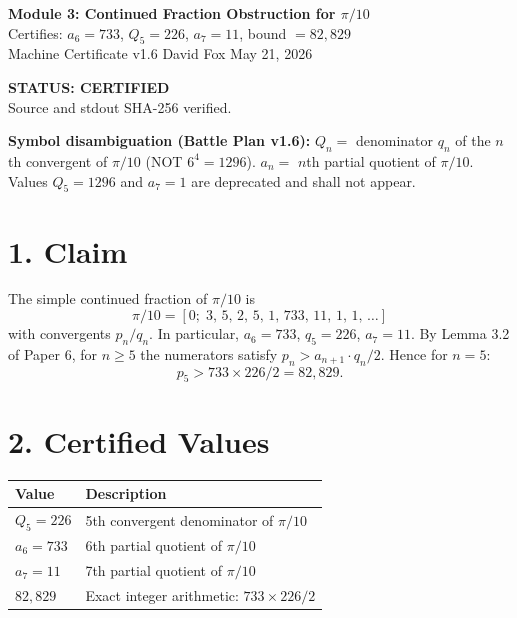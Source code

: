 \documentclass[11pt,letterpaper]{article}
\begin{document}
\begin{center}
{\Large\bfseries Module 3: Continued Fraction Obstruction for $\pi/10$}\\[4pt]
{\large Certifies: $a_6 = 733$, $Q_5 = 226$, $a_7 = 11$, bound $= 82{,}829$}\\[2pt]
{\normalsize Machine Certificate v1.6 \quad David Fox \quad May 21, 2026}
\end{center}
\vspace{0.5em}
\begin{center}
\colorbox{certgreen!15}{\parbox{0.85\textwidth}{\centering
\textcolor{certgreen}{\bfseries STATUS: CERTIFIED \checkmark}\\
Source and stdout SHA-256 verified.
}}
\end{center}

\vspace{0.5em}
\noindent\textbf{Symbol disambiguation (Battle Plan v1.6):}
$Q_n = $ denominator $q_n$ of the $n$th convergent of $\pi/10$ (NOT $6^4 = 1296$).
$a_n = $ $n$th partial quotient of $\pi/10$.
Values $Q_5 = 1296$ and $a_7 = 1$ are deprecated and shall not appear.

\section*{1. Claim}

The simple continued fraction of $\pi/10$ is
\[
  \pi/10 = [0;\; 3,\, 5,\, 2,\, 5,\, 1,\, 733,\, 11,\, 1,\, 1,\, \ldots]
\]
with convergents $p_n/q_n$.  In particular, $a_6 = 733$, $q_5 = 226$, $a_7 = 11$.
By Lemma 3.2 of Paper 6, for $n \geq 5$ the numerators satisfy
$p_n > a_{n+1} \cdot q_n / 2$.  Hence for $n = 5$:
\[
  p_5 > 733 \times 226 / 2 = 82{,}829.
\]

\section*{2. Certified Values}

\begin{center}
\begin{tabular}{|l|l|}
\hline
\textbf{Value} & \textbf{Description} \\
\hline
$Q_5 = 226$ & 5th convergent denominator of $\pi/10$ \\
$a_6 = 733$ & 6th partial quotient of $\pi/10$ \\
$a_7 = 11$ & 7th partial quotient of $\pi/10$ \\
$82{,}829$ & Exact integer arithmetic: $733 \times 226 / 2$ \\
\hline
\end{tabular}
\end{center}
\end{document}
